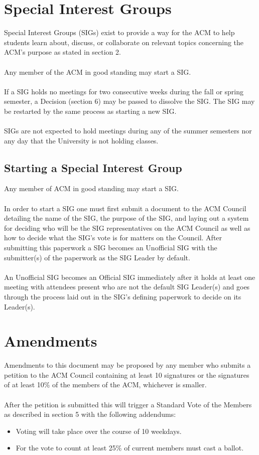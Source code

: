 \documentclass[12pt,titlepage]{article}
\begin{document}
\section{Special Interest Groups}

Special Interest Groups (SIGs) exist to provide a way for the ACM to help students learn about, discuss, or collaborate on relevant topics concerning the ACM's purpose as stated in section 2.\\ 
\\
Any member of the ACM in good standing may start a SIG.\\
\\
If a SIG holds no meetings for two consecutive weeks during the fall or spring semester, a Decision (section 6) may be passed to dissolve the SIG. The SIG may be restarted by the same process as starting a new SIG.\\
\\
SIGs are not expected to hold meetings during any of the summer semesters nor any day that the University is not holding classes. 

\subsection{Starting a Special Interest Group}

Any member of ACM in good standing may start a SIG.\\
\\
In order to start a SIG one must first submit a document to the ACM Council detailing the name of the SIG, the purpose of the SIG, and laying out a system for deciding who will be the SIG representatives on the ACM Council as well as how to decide what the SIG's vote is for matters on the Council. After submitting this paperwork a SIG becomes an Unofficial SIG with the submitter(s) of the paperwork as the SIG Leader by default.\\
\\
An Unofficial SIG becomes an Official SIG immediately after it holds at least one meeting with attendees present who are not the default SIG Leader(s) and goes through the process laid out in the SIG's defining paperwork to decide on its Leader(s).

\section{Amendments}

Amendments to this document may be proposed by any member who submits a petition to the ACM Council containing at least 10 signatures or the signatures of at least 10\% of the members of the ACM, whichever is smaller.\\
\\
After the petition is submitted this will trigger a Standard Vote of the Members as described in section 5 with the following addendums:
\begin{itemize}
	\item Voting will take place over the course of 10 weekdays.
	\item For the vote to count at least 25\% of current members must cast a ballot.
\end{itemize}
\end{document}
